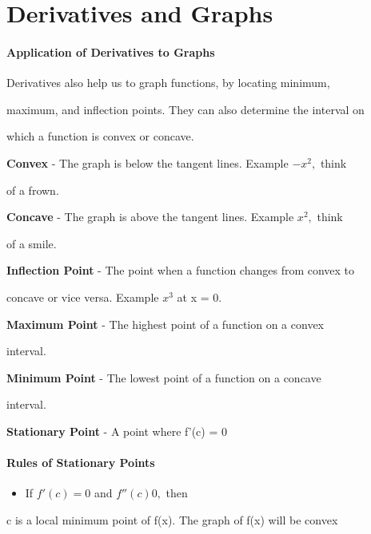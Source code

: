 \section{Derivatives and Graphs}
\label{sec:derivatives-and-graphs}

\paragraph{Application of Derivatives to Graphs}



Derivatives also help us to graph functions, by locating minimum,

maximum, and inflection points. They can also determine the interval on

which a function is convex or concave.



\textbf{Convex} - The graph is below the tangent lines. Example $-x^2,$ think

of a frown.



\textbf{Concave} - The graph is above the tangent lines. Example $x^2,$ think

of a smile.



\textbf{Inflection Point} - The point when a function changes from convex to

concave or vice versa. Example $x^3$ at x = 0.



\textbf{Maximum Point} - The highest point of a function on a convex

interval.



\textbf{Minimum Point} - The lowest point of a function on a concave

interval.



\textbf{Stationary Point} - A point where f'(c) = 0



\paragraph{Rules of Stationary Points}



\begin{itemize}
    \item If $f' \left ( c \right ) = 0$ and $f'' \left ( c \right ) 0,$ then
\end{itemize}
    c is a local minimum point of f(x). The graph of f(x) will be convex


